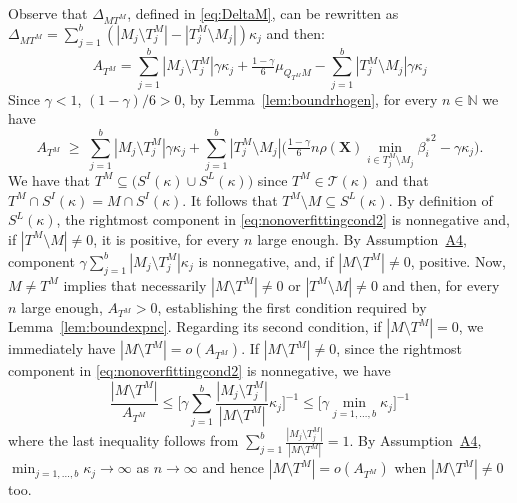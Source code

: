 \documentclass[
  12pt]{article}
\newcommand{\N}{\mathbb{N}}
\newcommand{\T}{\mathcal{T}}
\newcommand{\bX}{\mathbf{X}}
\begin{document}
Observe that $\Delta_{MT^M}$, defined in \eqref{eq:DeltaM}, can be rewritten as $\Delta_{MT^M}=\sum_{j=1}^b(|M_j\setminus T^M_j|-|T^M_j\setminus M_j|)\kappa_j$ and then:
$$ A_{T^M}=\sum_{j=1}^b|M_j\setminus T^M_j|\gamma\kappa_j+\tfrac{1-\gamma}{6}\mu_{Q_{T^M}M}-\sum_{j=1}^b|T^M_j\setminus M_j|\gamma\kappa_j $$
Since $\gamma <1$, $(1-\gamma)/6 >0$, by  Lemma~\ref{lem:boundrhogen}, for every $n\in \N$ we have 
\begin{equation}\label{eq:nonoverfittingcond2}
   A_{T^M}\;\geq\; \sum_{j=1}^b|M_j \setminus T^M_j|\gamma\kappa_j + \sum_{j=1}^b |T^M_j\setminus M_j |\Big(\tfrac{1-\gamma}{6} n \rho(\bX) \min_{i\in T^M_j\setminus M_j}{\beta^*_i}^{2} - \gamma\kappa_j\Big).
\end{equation} 
We have that $T^M\subseteq \big(S^I(\kappa) \cup S^L(\kappa)\big)$ since $T^M\in\T(\kappa)$ and that $T^M\cap S^{I}(\kappa) = M\cap S^{I}(\kappa)$. It follows that $T^M\setminus M \subseteq S^L(\kappa)$. By definition of $S^L(\kappa)$, the rightmost component in \eqref{eq:nonoverfittingcond2} is nonnegative and, if $|T^M\setminus M|\neq0$, it is positive, for every $n$ large enough. By Assumption~\hyperlink{lab:A4}{A4}, component $\gamma\sum_{j=1}^b|M_j \setminus T^M_j|\kappa_j$ is nonnegative, and, if $|M\setminus T^M|\neq0$, positive. Now, $M\neq T^M$ implies that necessarily $|M\setminus T^M|\neq0$ or $|T^M\setminus M|\neq0$ and then, for every $n$ large enough, $A_{T^M}>0$, establishing the first condition required by Lemma~\ref{lem:boundexpnc}. Regarding its second condition, if $|M\setminus T^M|=0$, we immediately have $|M\setminus T^M|=o(A_{T^M})$. If $|M\setminus T^M|\neq 0$, since the rightmost component in \eqref{eq:nonoverfittingcond2} is nonnegative, we have
$$\frac{|M\setminus T^M|}{A_{T^M}}\leq \bigg[ \gamma\sum_{j=1}^b\frac{|M_j \setminus T^M_j|}{|M\setminus T^M|}\kappa_j \bigg]^{-1} \leq \bigg[ \gamma\min_{j=1,\ldots,b}\kappa_j \bigg]^{-1} $$
where the last inequality follows from $\sum_{j=1}^b\frac{|M_j \setminus T^M_j|}{|M\setminus T^M|}=1$. By Assumption~\hyperlink{lab:A4}{A4}, $\min_{j=1,\ldots,b}\kappa_j\to \infty$ as $n\to\infty$ and hence $|M\setminus T^M|=o(A_{T^M})$ when $|M\setminus T^M|\neq 0$ too.
\end{document}
